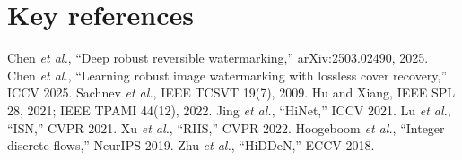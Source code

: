 \documentclass[10pt,a4paper]{article}
\begin{document}
\section*{Key references}
\small
Chen \emph{et al.}, ``Deep robust reversible watermarking,'' arXiv:2503.02490, 2025.
Chen \emph{et al.}, ``Learning robust image watermarking with lossless cover recovery,'' ICCV 2025.
Sachnev \emph{et al.}, IEEE TCSVT 19(7), 2009. Hu and Xiang, IEEE SPL 28, 2021; IEEE TPAMI 44(12), 2022.
Jing \emph{et al.}, ``HiNet,'' ICCV 2021. Lu \emph{et al.}, ``ISN,'' CVPR 2021. Xu \emph{et al.}, ``RIIS,'' CVPR 2022.
Hoogeboom \emph{et al.}, ``Integer discrete flows,'' NeurIPS 2019. Zhu \emph{et al.}, ``HiDDeN,'' ECCV 2018.
\end{document}

